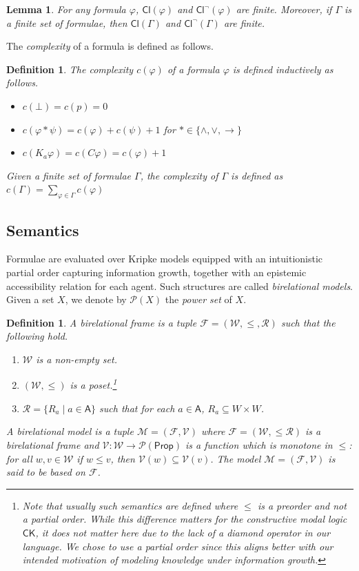 \documentclass{myifcolog}
\newcommand\C {C}
\newcommand{\K}{K}
\newcommand\Cl {\mathsf{Cl}}
\newcommand\Prop {\mathsf{Prop}}
\newcommand\A{\mathsf{A}}
\newcommand{\agi}{a}
\newcommand{\fw}{\mathcal{M}}
\newcommand{\W}{\mathcal{W}}
\newcommand{\rel}{\mathcal{R}}
\newcommand{\Fr}{\mathcal{F}}
\newcommand{\V}{\mathcal{V}}
\newtheorem{definition}[theorem]{Definition}
\newtheorem{lemma}[theorem]{Lemma}
\numberwithin{theorem}{section}
\begin{document}
\begin{lemma}\label{l: negation closure is finite}
    For any formula $\varphi$, $\Cl (\varphi)$ and $\Cl^\neg(\varphi)$ are finite. Moreover, if $\Gamma$ is a finite set of formulae, then $\Cl(\Gamma)$ and $\Cl^\neg(\Gamma)$ are finite.
\end{lemma}


The \emph{complexity} of a formula is defined as follows.

\begin{definition}\label{d: complexity}
    The \emph{complexity} $c(\varphi)$ of a formula $\varphi$ is defined inductively as follows.
    \begin{itemize}
        \item $c(\bot) = c(p) = 0$
        \item $c(\varphi \ast \psi) = c(\varphi) + c(\psi) +1$ for $\ast \in \{\wedge, \vee, \rightarrow\}$
        \item $c(\K_\agi \varphi) = c(\C \varphi) = c(\varphi) + 1$
    \end{itemize}
    Given a finite set of formulae $\Gamma$, the \emph{complexity} of $\Gamma$ is defined as $c(\Gamma) = \sum_{\varphi \in \Gamma}c(\varphi)$
\end{definition}

\subsection{Semantics}\label{ss: semantics}


Formulae are evaluated over Kripke models equipped with an intuitionistic partial order capturing information growth, together with an epistemic accessibility relation for each agent. Such structures are called \emph{birelational models}. Given a set $X$, we denote by $\mathcal{P}(X)$ the \emph{power set} of $X$.

\begin{definition}
    A \emph{birelational frame} is a tuple $\Fr= (\W, \leq, \rel)$ such that the following hold.
    \begin{enumerate}
        \item $\W$ is a non-empty set.
        \item $(\W, \leq)$ is a poset.\footnote{Note that usually such semantics are defined where $\leq$ is a preorder and not a partial order. While this difference matters for the constructive modal logic $\mathsf{CK}$, it does not matter here due to the lack of a diamond operator in our language. We chose to use a partial order since this aligns better with our intended motivation of modeling knowledge under information growth.}
        \item $\rel = \{ R_\agi \mid \agi \in \A\}$ such that for each $\agi \in \A$, $R_\agi \subseteq W \times W$.
    \end{enumerate}
    A \emph{birelational model} is a tuple $\fw=(\Fr, \V)$ where $\Fr =(\W, \leq \rel)$ is a birelational frame and $\V:\W \longrightarrow \mathcal{P}(\Prop)$ is a function which is monotone in $\leq$: for all $w,v \in \W$ if $w \leq v$, then $\V(w) \subseteq \V(v)$. The model $\fw =(\Fr, \V)$ is said to be \emph{based} on $\Fr$.
\end{definition}
\end{document}
